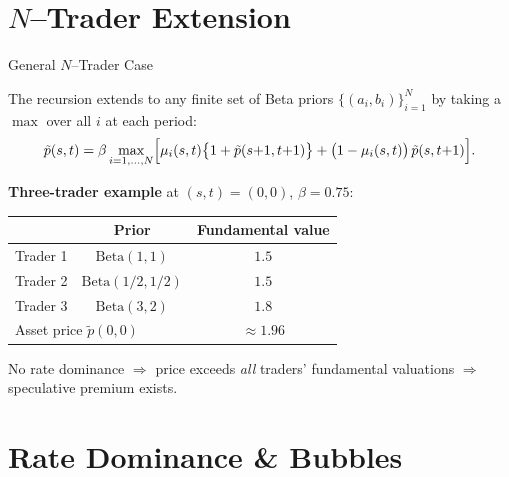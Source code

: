 \documentclass[11pt,aspectratio=169]{beamer}
\begin{document}
\section{$N$--Trader Extension}

\begin{frame}{General $N$--Trader Case}

The recursion extends to any finite set of Beta priors
$\{(a_i,b_i)\}_{i=1}^N$ by taking a $\max$ over all $i$ at each
period:
\[
  \tilde p(s,t) = \beta \max_{i=1,\ldots,N}\Bigl[
    \mu_i(s,t)\bigl\{1+\tilde p(s{+}1,t{+}1)\bigr\}
    + \bigl(1-\mu_i(s,t)\bigr)\,\tilde p(s,t{+}1)
  \Bigr].
\]

\medskip

\textbf{Three-trader example} at $(s,t)=(0,0)$, $\beta=0.75$:

\begin{center}
\renewcommand{\arraystretch}{1.3}
\begin{tabular}{lcc}
\toprule
  & Prior & Fundamental value \\
\midrule
Trader 1 & $\text{Beta}(1,1)$ & $1.5$ \\
Trader 2 & $\text{Beta}(1/2,1/2)$ & $1.5$ \\
Trader 3 & $\text{Beta}(3,2)$ & $1.8$ \\
\midrule
\multicolumn{2}{l}{Asset price $\tilde p(0,0)$} & $\approx 1.96$ \\
\bottomrule
\end{tabular}
\end{center}

\medskip

No rate dominance $\Rightarrow$ price exceeds \emph{all} traders'
fundamental valuations $\Rightarrow$ speculative premium exists.

\end{frame}


\section{Rate Dominance \& Bubbles}
\end{document}

